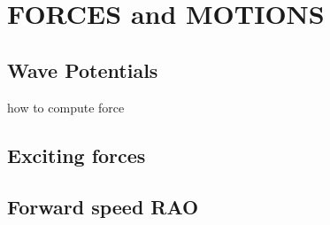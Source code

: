 \chapter{FORCES and MOTIONS}

\section{Wave Potentials}
how to compute force 
\section{Exciting forces}
\section{Forward speed RAO}